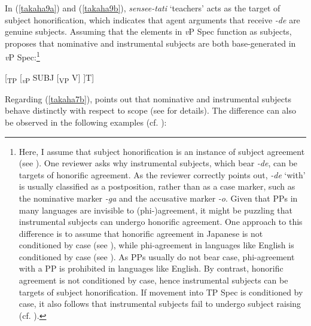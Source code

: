 \documentclass[output=paper]{langscibook}
\begin{document}
In (\ref{takaha9a}) and (\ref{takaha9b}), \emph{sensee-tati} ‘teachers’ acts as the target of subject honorification, which indicates that agent arguments that receive \emph{-de} are genuine subjects. Assuming that the elements in \emph{v}P Spec function as subjects, \citet{Kishimoto2010} proposes that nominative and instrumental subjects are both base-generated in \emph{v}P Spec:\footnote{Here, I assume that subject honorification is an instance of subject agreement (see \citealt{Ura1999, Takano2011, Kishimoto2012}). One reviewer asks why instrumental subjects, which bear \emph{-de}, can be targets of honorific agreement. As the reviewer correctly points out, \emph{-de} ‘with’ is usually classified as a postposition, rather than as a case marker, such as the nominative marker \emph{-ga} and the accusative marker \emph{-o}. Given that PPs in many languages are invisible to (phi-)agreement, it might be puzzling that instrumental subjects can undergo honorific agreement. One approach to this difference is to assume that honorific agreement in Japanese is not conditioned by case (see \citealt{Kishimoto2012}), while phi-agreement in languages like English is conditioned by case (see \citealt{Chomsky2000}). As PPs usually do not bear case, phi-agreement with a PP is prohibited in languages like English. By contrast, honorific agreement is not conditioned by case, hence instrumental subjects can be targets of subject honorification. If movement into TP Spec is conditioned by case, it also follows that instrumental subjects fail to undergo subject raising (cf. \citealt{Kishimoto2010}).} 

\begin{exe}
\ex \label{takaha10}
[\textsubscript{TP} \hspace{3mm}[\textsubscript{\emph{v}P} \hspace{3mm} SUBJ \hspace{3mm} [\textsubscript{VP} V]\hspace{1mm} ]\hspace{1mm}T]
\end{exe}

Regarding (\ref{takaha7b}), \citet{Kishimoto2010} points out that nominative and instrumental subjects behave distinctly with respect to scope (see \citealt{Kishimoto2010} for details). The difference can also be observed in the following examples (cf. \citealt{Kitaoka2014}):
\end{document}
